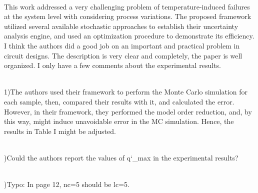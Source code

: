 \begin{reviewer}
\\
This work addressed a very challenging problem of temperature-induced failures
at the system level with considering process variations. The proposed framework
utilized several available stochastic approaches to establish their uncertainty
analysis engine, and used an optimization procedure to demonstrate its
efficiency. I think the authors did a good job on an important and practical
problem in circuit designs. The description is very clear and completely, the
paper is well organized. I only have a few comments about the experimental
results.
\end{reviewer}
\begin{authors}
\begin{actions}
\end{actions}
\end{authors}

\begin{reviewer}
\noindent{}\\
1)The authors used their framework to perform the Monte Carlo
simulation for each sample, then, compared their results with it, and
calculated the error. However, in their framework, they performed the model
order reduction, and, by this way, might induce unavoidable error in the MC
simulation. Hence, the results in Table I might be adjusted.
\end{reviewer}

\begin{authors}
\begin{actions}
\end{actions}
\end{authors}

\begin{reviewer}
\\
)Could the authors report the values of q\char`_max in the
experimental results?
\end{reviewer}

\begin{authors}
\begin{actions}
\end{actions}
\end{authors}

\begin{reviewer}
\\
)Typo: In page 12, nc=5 should be lc=5.
\end{reviewer}

\begin{authors}
\begin{actions}
\end{actions}
\end{authors}
